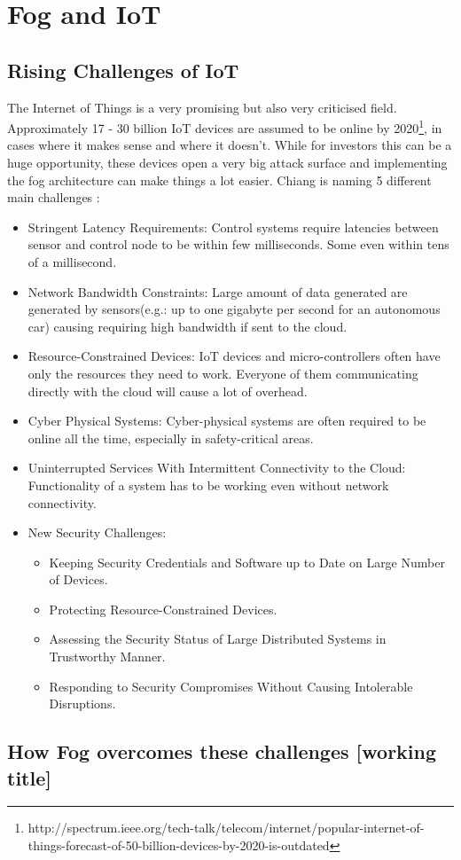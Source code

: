 \section{Fog and IoT}

\subsection{Rising Challenges of IoT}
The Internet of Things is a very promising but also very criticised field.
Approximately 17 - 30 billion IoT devices are assumed to be online by 2020\footnote{http://spectrum.ieee.org/tech-talk/telecom/internet/popular-internet-of-things-forecast-of-50-billion-devices-by-2020-is-outdated}, in cases where it makes sense and where it doesn't. While for investors this can be a huge opportunity, these devices open a very big attack surface and implementing the fog architecture can make things a lot easier. Chiang is naming 5 different main challenges \cite[s. 855 ff.]{DBLP:journals/iotj/ChiangZ16}:

\begin{itemize}
	\item [A] Stringent Latency Requirements: Control systems require latencies between sensor and control node to be within few milliseconds. Some even within tens of a millisecond.
	\item [B] Network Bandwidth Constraints: Large amount of data generated are generated by sensors(e.g.: up to one gigabyte per second for an autonomous car) causing requiring high bandwidth if sent to the cloud.
	\item [C] Resource-Constrained Devices: IoT devices and micro-controllers often have only the resources they need to work. Everyone of them communicating directly with the cloud will cause a lot of overhead.
	\item [D] Cyber Physical Systems: Cyber-physical systems are often required to be online all the time, especially in safety-critical areas.
	\item [E] Uninterrupted Services With Intermittent Connectivity to the Cloud: Functionality of a system has to be working even without network connectivity.
    \item [F] New Security Challenges:
	\begin{itemize}
		\item[1)] Keeping Security Credentials and Software up to Date on Large Number of Devices.
		\item[2)] Protecting Resource-Constrained Devices.
		\item[3)] Assessing the Security Status of Large Distributed Systems in Trustworthy Manner.
		\item[4)] Responding to Security Compromises Without Causing Intolerable Disruptions.
	\end{itemize}
\end{itemize}

\subsection{How Fog overcomes these challenges [working title]}


